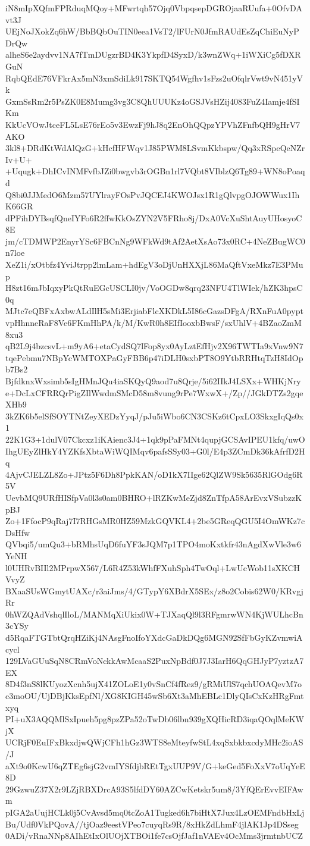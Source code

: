 iN8mIpXQfmFPRduqMQoy+MFwrtqh57Ojq0VbpqsepDGROjaaRUufa+0OfvDAvt3J
UEjNoJXokZq6hW/BbBQbOuTIN0eea1VsT2/lFUrN0JfmRAUdEsZqChiEuNyPDrQw
alheS6e2aydvv1NA7fTmDUgzrBD4K3YkpfD4SyxD/k3wnZWq+1iWXiCg5fDXRGuN
RqbQEdE76VFkrAx5mN3xmSdiLk917SKTQ54Wgfhv1sFzs2uOfqlrVwt9vN451yVk
GxmSsRm2r5PsZK0E8Mumg3vg3C8QhUUUKz4oGSJVsHZij4083FuZ4Iamje4fSIKm
KkUcVOwJtceFL5LsE76rEo5v3EwzFj9hJ8q2EnOhQQpzYPVhZFnfbQH9gHrV7AKO
3kl8+DRdKtWdAlQzG+kHcfHFWqv1J85PWM8LSvmKkbspw/Qq3xRSpeQeNZrIv+U+
+Uqugk+DhICvINMFvfbJZi0bwgvb3rOGBn1rl7VQbt8VIblzQ6Tg89+WN8oPoaqd
Q8bi0JJMedO6Mzm57UYlrayFOsPvJQCEJ4KWOJsx1R1gQlvpgOJOWWux1IhK66GR
dPFihDYBsqfQneIYFo6R2ffwKkOsZYN2V5FRho8j/DxA0VcXuShtAuyUHosyoC8E
jm/cTDMWP2EnyrYSc6FBCnNg9WFkWd9tAf2AetXsAo73x0RC+4NeZBugWC0n7loe
XeZ1i/xOtbfz4YviJtrpp2lmLam+hdEgV3oDjUnHXXjL86MaQftVxeMkz7E3PMup
H8zt16mJbIqxyPkQtRuEGcUSCLI0jv/VoOGDw8qrq23NFU4TlWIek/hZK3hpsC0q
MJtc7eQBFxAxbwALdIlH5sMi3ErjiabFlcXKDkL5I86cGazsDFgA/RXnFuA0pypt
vpHhnneRaF8Ve6FKmHhPA/k/M/KwR0h8EIfIooxbBwsF/sxUhlV+4BZaoZmM8xu3
qB2L9j4bzcsvL+m9yA6+etaCydSQ7lFop8yx0AyLztEfHjv2X96TWTIa9xVnw9N7
tqePebmu7NBpYcWMTOXPaGyFBB6p47iDLH0sxbPT8O9YtbRRHtqTzH8IdOpb7Bs2
BjfdknxWxsimb5sIgHMnJQu4iaSKQyQ9aod7u8Qrje/5i62IIkJ4LSXx+WHKjNry
e+DcLxCFRRQrPigZIlWwdmSMcD58m8vung9rPe7WxwX+/Zp//JGkDTZs2gqeXHb9
3kZK6b5elSfSOYTNtZeyXEDzYyqJ/pJu5iWbo6CN3CSKz6tCpxLO3SkxgIqQs0x1
22K1G3+1dulV07Ckcxz1iKAienc3J4+1qk9pPaFMNt4qupjGCSAvIPEU1kfq/uwO
IhgUEyZlHkY4YZKfsXbtaWiWQIMqv6pafsSSy03+G0l/E4p3ZCmDk36kAfrfD2Hq
4AjvCJELZL8Zo+JPtz5F6Dh8PpkKAN/oD1kX7IIge62QlZW9Sk5635RlGOdg6R5V
UevbMQ9URfHISfpVa0l3s0am0BHRO+lRZKwMeZjd8ZnTfpA58ArEvxVSubzzKpBJ
Zo+1FfocP9qRaj7I7RHGsMR0HZ59MzkGQVKL4+2be5GReqQGU5I4OmWKz7cDsHfw
QVbqi5/umQu3+bRMhsUqD6fuYF3sJQM7p1TPO4moKxtkfr43nAgdXwVle3w6YeNH
l0UHRvBIIl2MPrpwX567/L6R4Z53kWhfFXuhSph4TwOql+LwUcWob11sXKCHVvyZ
BXaaSUsWGmytUAXc/r3aiJms/4/GTypY6XBdrX5SEx/z8o2Cobis62W0/KRvgjRr
0hWZQAdVshqlIloL/MANMqXiUkix0W+TJXaqQl9l3RFgmrwWN4KjWULhcBn3cYSy
d5RqaFTGTbtQrqHZiKj4NAsgFnoIfoYXdcGaDkDQg6MGN92SfFbGyKZvmwiAcycl
129LVaGUuSqN8CRmVoNckkAwMcaaS2PuxNpBdf0J7J3IarH6QqGHJyP7yztzA7EX
8D4f3nS8lKUyozXcnh5ujX41ZOLoE1y0vSnCf4fRez9/gRMiUlS7qchUOAQevM7o
c3moOU/UjDBjKksEpfNl/XG8KIGH45wSb6Xt3aMhEBLc1DlyQIsCxKzHRgFmtxyq
PI+uX3AQQMlSxIpueh5pg8pzZPa52oTwDb06lbn939gXQHicRD3iqaQOqlMeKWjX
UCRjF0EuIFxBkxdjwQWjCFh1hGz3WTS8eMteyfwStL4xqSxbkbxcdyMHc2ioAS/J
aXt9o0KcwU6qZTEg6sjG2vmIYSfdjbREtTgxUUP9V/G+keGed5FoXxV7oUqYeE8D
29GzwuZ37X2r9LZjRBXDrcA93S5lfdDY60AZCwKetskr5um8/3YfQErEvvEIFAwm
pIGA2aUujHCLk0j5CvAvsd5mq0tcZoA1Tugked6h7biHtX7Jux4LzOEMFndbHxLj
Bu/Udf0VkPQovA//tjOaz9eestVPeo7cuyqRs9R/8xHkZdLhmF4jlAK1Jp4DSseg
0ADi/vRnaNNp8AIhEtIxOlUOjXTBOi1fe7csOjfJaf1nVAEv4OcMms3jrmtnbUCZ
